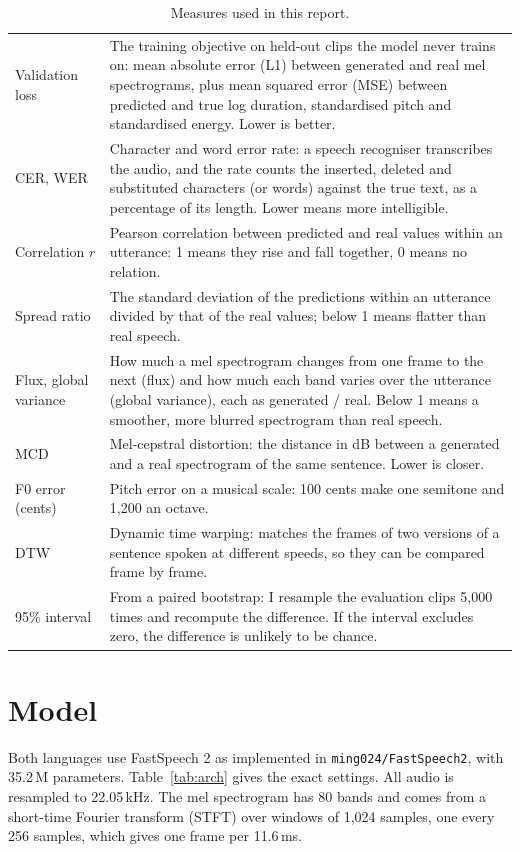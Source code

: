 \documentclass[11pt,a4paper]{article}
\newcommand{\code}[1]{\texttt{#1}}
\begin{document}
\begin{table}[t]\centering\small
\caption{Measures used in this report.}
\label{tab:terms}
\begin{tabularx}{\linewidth}{@{}lX@{}}
\toprule
Validation loss & The training objective on held-out clips the model never trains on: mean absolute error (L1)
between generated and real mel spectrograms, plus mean squared error (MSE) between predicted and true log
duration, standardised pitch and standardised energy. Lower is better. \\
CER, WER & Character and word error rate: a speech recogniser transcribes the audio, and the rate counts the
inserted, deleted and substituted characters (or words) against the true text, as a percentage of its length.
Lower means more intelligible. \\
Correlation $r$ & Pearson correlation between predicted and real values within an utterance: 1 means they rise and
fall together, 0 means no relation. \\
Spread ratio & The standard deviation of the predictions within an utterance divided by that of the real values;
below 1 means flatter than real speech. \\
Flux, global variance & How much a mel spectrogram changes from one frame to the next (flux) and how much each band
varies over the utterance (global variance), each as generated / real. Below 1 means a smoother, more blurred
spectrogram than real speech. \\
MCD & Mel-cepstral distortion: the distance in dB between a generated and a real spectrogram of the same sentence.
Lower is closer. \\
F0 error (cents) & Pitch error on a musical scale: 100 cents make one semitone and 1,200 an octave. \\
DTW & Dynamic time warping: matches the frames of two versions of a sentence spoken at different speeds, so they
can be compared frame by frame. \\
95\% interval & From a paired bootstrap: I resample the evaluation clips 5,000 times and recompute the difference. If
the interval excludes zero, the difference is unlikely to be chance. \\
\bottomrule
\end{tabularx}
\end{table}

\section{Model}
\label{sec:model}
Both languages use FastSpeech 2 as implemented in \code{ming024/FastSpeech2}, with 35.2\,M parameters.
Table~\ref{tab:arch} gives the exact settings. All audio is resampled to 22.05\,kHz. The mel spectrogram has 80
bands and comes from a short-time Fourier transform (STFT) over windows of 1,024 samples, one every 256 samples,
which gives one frame per 11.6\,ms.
\end{document}
